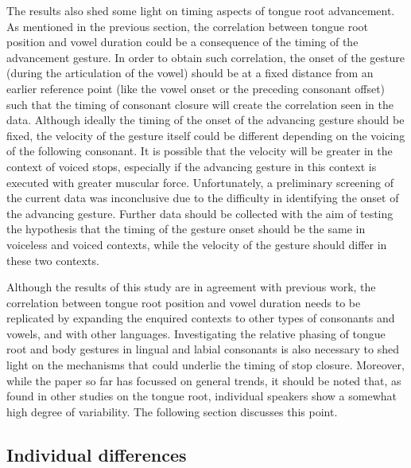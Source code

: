 \documentclass[12pt,]{article}
\begin{document}
The results also shed some light on timing aspects of tongue root
advancement. As mentioned in the previous section, the correlation
between tongue root position and vowel duration could be a consequence
of the timing of the advancement gesture. In order to obtain such
correlation, the onset of the gesture (during the articulation of the
vowel) should be at a fixed distance from an earlier reference point
(like the vowel onset or the preceding consonant offset) such that the
timing of consonant closure will create the correlation seen in the
data. Although ideally the timing of the onset of the advancing gesture
should be fixed, the velocity of the gesture itself could be different
depending on the voicing of the following consonant. It is possible that
the velocity will be greater in the context of voiced stops, especially
if the advancing gesture in this context is executed with greater
muscular force. Unfortunately, a preliminary screening of the current
data was inconclusive due to the difficulty in identifying the onset of
the advancing gesture. Further data should be collected with the aim of
testing the hypothesis that the timing of the gesture onset should be
the same in voiceless and voiced contexts, while the velocity of the
gesture should differ in these two contexts.

Although the results of this study are in agreement with previous work,
the correlation between tongue root position and vowel duration needs to
be replicated by expanding the enquired contexts to other types of
consonants and vowels, and with other languages. Investigating the
relative phasing of tongue root and body gestures in lingual and labial
consonants is also necessary to shed light on the mechanisms that could
underlie the timing of stop closure. Moreover, while the paper so far
has focussed on general trends, it should be noted that, as found in
other studies on the tongue root, individual speakers show a somewhat
high degree of variability. The following section discusses this point.

\hypertarget{individual-differences}{%
\subsection{Individual differences}\label{individual-differences}}

\label{s:idio}
\end{document}
